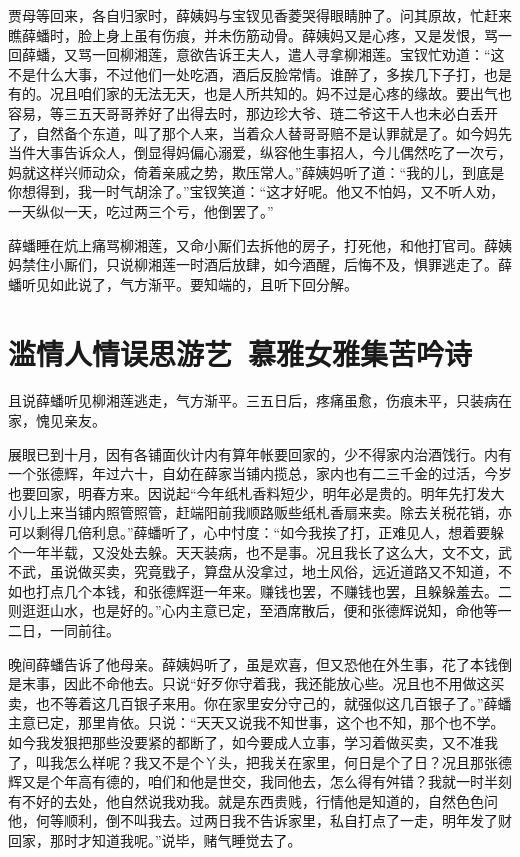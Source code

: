 \documentclass[12pt,oneside]{book}
\begin{document}
贾母等回来，各自归家时，薛姨妈与宝钗见香菱哭得眼睛肿了。问其原故，忙赶来瞧薛蟠时，脸上身上虽有伤痕，并未伤筋动骨。薛姨妈又是心疼，又是发恨，骂一回薛蟠，又骂一回柳湘莲，意欲告诉王夫人，遣人寻拿柳湘莲。宝钗忙劝道：“这不是什么大事，不过他们一处吃酒，酒后反脸常情。谁醉了，多挨几下子打，也是有的。况且咱们家的无法无天，也是人所共知的。妈不过是心疼的缘故。要出气也容易，等三五天哥哥养好了出得去时，那边珍大爷、琏二爷这干人也未必白丢开了，自然备个东道，叫了那个人来，当着众人替哥哥赔不是认罪就是了。如今妈先当件大事告诉众人，倒显得妈偏心溺爱，纵容他生事招人，今儿偶然吃了一次亏，妈就这样兴师动众，倚着亲戚之势，欺压常人。”薛姨妈听了道：“我的儿，到底是你想得到，我一时气胡涂了。”宝钗笑道：“这才好呢。他又不怕妈，又不听人劝，一天纵似一天，吃过两三个亏，他倒罢了。”

薛蟠睡在炕上痛骂柳湘莲，又命小厮们去拆他的房子，打死他，和他打官司。薛姨妈禁住小厮们，只说柳湘莲一时酒后放肆，如今酒醒，后悔不及，惧罪逃走了。薛蟠听见如此说了，气方渐平。要知端的，且听下回分解。
 

 
\chapter{滥情人情误思游艺~慕雅女雅集苦吟诗}
且说薛蟠听见柳湘莲逃走，气方渐平。三五日后，疼痛虽愈，伤痕未平，只装病在家，愧见亲友。

展眼已到十月，因有各铺面伙计内有算年帐要回家的，少不得家内治酒饯行。内有一个张德辉，年过六十，自幼在薛家当铺内揽总，家内也有二三千金的过活，今岁也要回家，明春方来。因说起“今年纸札香料短少，明年必是贵的。明年先打发大小儿上来当铺内照管照管，赶端阳前我顺路贩些纸札香扇来卖。除去关税花销，亦可以剩得几倍利息。”薛蟠听了，心中忖度：“如今我挨了打，正难见人，想着要躲个一年半载，又没处去躲。天天装病，也不是事。况且我长了这么大，文不文，武不武，虽说做买卖，究竟戥子，算盘从没拿过，地土风俗，远近道路又不知道，不如也打点几个本钱，和张德辉逛一年来。赚钱也罢，不赚钱也罢，且躲躲羞去。二则逛逛山水，也是好的。”心内主意已定，至酒席散后，便和张德辉说知，命他等一二日，一同前往。

晚间薛蟠告诉了他母亲。薛姨妈听了，虽是欢喜，但又恐他在外生事，花了本钱倒是末事，因此不命他去。只说“好歹你守着我，我还能放心些。况且也不用做这买卖，也不等着这几百银子来用。你在家里安分守己的，就强似这几百银子了。”薛蟠主意已定，那里肯依。只说：“天天又说我不知世事，这个也不知，那个也不学。如今我发狠把那些没要紧的都断了，如今要成人立事，学习着做买卖，又不准我了，叫我怎么样呢？我又不是个丫头，把我关在家里，何日是个了日？况且那张德辉又是个年高有德的，咱们和他是世交，我同他去，怎么得有舛错？我就一时半刻有不好的去处，他自然说我劝我。就是东西贵贱，行情他是知道的，自然色色问他，何等顺利，倒不叫我去。过两日我不告诉家里，私自打点了一走，明年发了财回家，那时才知道我呢。”说毕，赌气睡觉去了。
\end{document}
